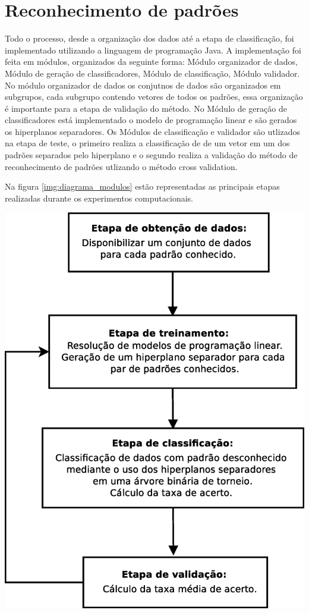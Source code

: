 \chapter{Reconhecimento de padrões}
Todo o processo, desde a organização dos dados até a etapa de classificação, foi implementado utilizando a linguagem de programação Java. A implementação foi feita em módulos, organizados da seguinte forma: Módulo organizador de dados, Módulo de geração de classificadores, Módulo de classificação, Módulo validador. No módulo organizador de dados os conjutnos de dados são organizados em subgrupos, cada subgrupo contendo vetores de todos os padrões, essa organização é importante para a etapa de validação do método. No Módulo de geração de classificadores está implementado o modelo de programação linear e são gerados os hiperplanos separadores. Os Módulos de classificação e validador são utlizados na etapa de teste, o primeiro realiza a classificação de de um vetor em um dos padrões separados pelo hiperplano e o segundo realiza a validação do método de reconhecimento de padrões utlizando o método cross validation.

Na figura \ref{img:diagrama_modulos} estão representadas as principais etapas realizadas durante os experimentos computacionais.

\begin{center}
	\includegraphics[scale=0.5]{graficos/diagrama_metodologia}
	\label{img:diagrama_modulos}
\end{center}

